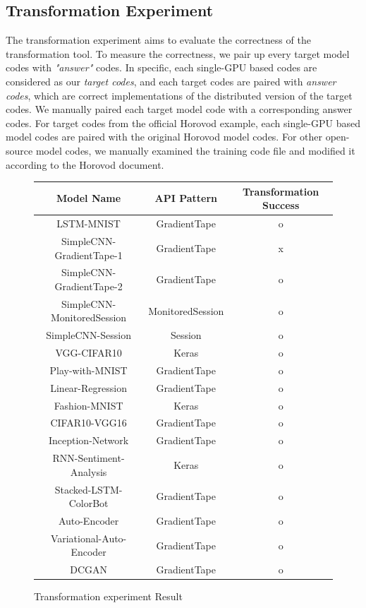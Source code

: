 \subsection{Transformation Experiment}

The transformation experiment aims to evaluate the correctness of the
transformation tool. To measure the correctness, we pair up every
target model codes with \textit{"answer"} codes. In specific,      
each single-GPU based codes are considered as our \textit{target codes},
and each target codes are paired with \textit{answer codes}, which are
correct implementations of the distributed version of the target codes. 
We manually paired each target model code with a corresponding answer codes.
For target codes from the official Horovod example, each single-GPU based
model codes are paired with the original Horovod model codes.     
For other open-source model codes, we manually examined the training code
file and modified it according to the Horovod document.


\begin{figure}[!ht]
  \begin{center}
  \begin{tabular}{|c|c|c|}
    \hline
    Model Name & API Pattern & Transformation Success \\
    \hline
    LSTM-MNIST & GradientTape & o \\
    SimpleCNN-GradientTape-1 & GradientTape & x\\
    SimpleCNN-GradientTape-2 & GradientTape & o \\
    SimpleCNN-MonitoredSession & MonitoredSession &o\\
    SimpleCNN-Session & Session & o\\
    VGG-CIFAR10 & Keras & o \\ 
    Play-with-MNIST & GradientTape & o \\
    Linear-Regression & GradientTape & o \\
    Fashion-MNIST & Keras & o \\
    CIFAR10-VGG16 & GradientTape & o\\
    Inception-Network & GradientTape & o \\
    RNN-Sentiment-Analysis & Keras & o \\
    Stacked-LSTM-ColorBot & GradientTape & o \\
    Auto-Encoder & GradientTape & o \\
    Variational-Auto-Encoder & GradientTape & o \\
    DCGAN & GradientTape & o \\
    \hline
  \end{tabular}
  \end{center}
  \caption{Transformation experiment Result}
  \label{fig:eval:trans}
\end{figure}

